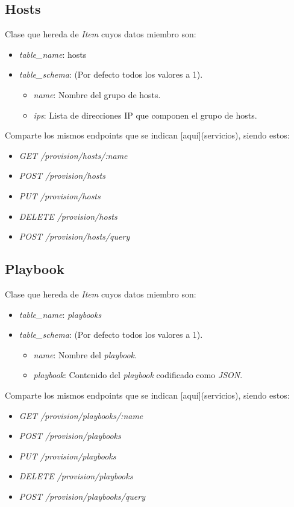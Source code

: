 \subsection{Hosts}

Clase que hereda de \textit{Item} cuyos datos miembro son:
\begin{itemize}
	\item \textit{table\_name}: hosts
	\item \textit{table\_schema}: (Por defecto todos los valores a 1).
	\begin{itemize}
		\item \textit{name}: Nombre del grupo de hosts.
		\item \textit{ips}: Lista de direcciones IP que componen el grupo de hosts.
	\end{itemize}
\end{itemize}
	
\bigskip
Comparte los mismos endpoints que se indican [aquí](servicios), siendo estos:
\begin{itemize}
	\item \textit{GET /provision/hosts/:name}
	\item \textit{POST /provision/hosts}
	\item \textit{PUT /provision/hosts}
	\item \textit{DELETE /provision/hosts}
	\item \textit{POST /provision/hosts/query}
\end{itemize}


\subsection{Playbook}

Clase que hereda de \textit{Item} cuyos datos miembro son:
\begin{itemize}
	\item \textit{table\_name}: \textit{playbooks}
	\item \textit{table\_schema}: (Por defecto todos los valores a 1).
	\begin{itemize}
		\item \textit{name}: Nombre del \textit{playbook}.
		\item \textit{playbook}: Contenido del \textit{playbook} codificado como \textit{JSON}.
	\end{itemize}
\end{itemize}
	
\bigskip
Comparte los mismos endpoints que se indican [aquí](servicios), siendo estos:
\begin{itemize}
	\item \textit{GET /provision/playbooks/:name}
	\item \textit{POST /provision/playbooks}
	\item \textit{PUT /provision/playbooks}
	\item \textit{DELETE /provision/playbooks}
	\item \textit{POST /provision/playbooks/query}
\end{itemize}

